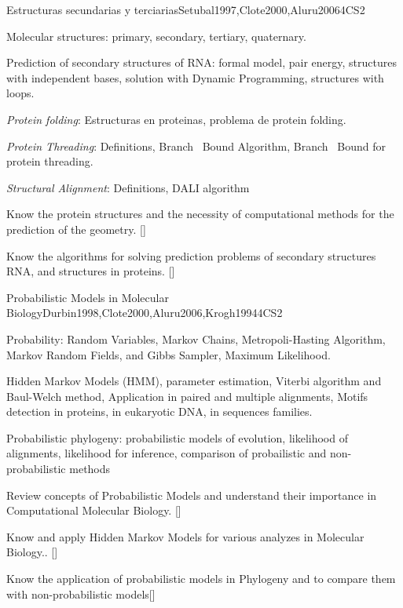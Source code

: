 \begin{syllabus}
\begin{unit}{Estructuras secundarias y terciarias}{}{Setubal1997,Clote2000,Aluru2006}{4}{CS2}
   \begin{topics}
    \item Molecular structures: primary, secondary, tertiary, quaternary.
    \item Prediction of secondary structures of RNA: formal model, pair energy, structures with independent bases, solution with Dynamic Programming, structures with loops.
    \item {\it Protein folding}: Estructuras en proteinas, problema de protein folding.
    \item {\it Protein Threading}: Definitions, Branch \ Bound Algorithm, Branch \ Bound for protein threading.
    \item {\it Structural Alignment}: Definitions, DALI algorithm
   \end{topics}
   \begin{learningoutcomes}
     \item Know the protein structures and the necessity of computational methods for the prediction of the geometry. [\Familiarity]
	   \item Know the algorithms for solving prediction problems of secondary structures RNA, and structures in proteins. [\Assessment]
   \end{learningoutcomes}
\end{unit}

\begin{unit}{Probabilistic Models in Molecular Biology}{}{Durbin1998,Clote2000,Aluru2006,Krogh1994}{4}{CS2}
   \begin{topics}
    \item Probability: Random Variables, Markov Chains, Metropoli-Hasting Algorithm, Markov Random Fields, and Gibbs Sampler, Maximum Likelihood.
    \item Hidden Markov Models (HMM),  parameter estimation, Viterbi algorithm and Baul-Welch method, Application in paired and multiple alignments, Motifs detection in proteins, in eukaryotic DNA, in sequences families.
		\item Probabilistic phylogeny: probabilistic models of evolution, likelihood of alignments, likelihood for inference, comparison of probailistic and non-probabilistic methods
   \end{topics}
   \begin{learningoutcomes}
      \item  Review concepts of Probabilistic Models and understand their importance in Computational Molecular Biology. [\Assessment]
	  \item Know and apply Hidden Markov Models for various analyzes in Molecular Biology.. [\Usage]
		\item Know the application of probabilistic models in Phylogeny and to compare them with non-probabilistic models[\Assessment]
   \end{learningoutcomes}
\end{unit}



\begin{coursebibliography}
\end{coursebibliography}

\end{syllabus}
